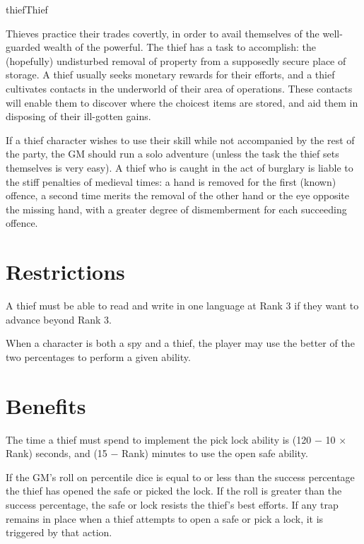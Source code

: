 \begin{Skill}[1.2]{thief}{Thief}

Thieves practice their trades covertly, in order to avail themselves
of the well-guarded wealth of the powerful.  The thief has a task to
accomplish: the (hopefully) undisturbed removal of property from a
supposedly secure place of storage.  A thief usually seeks monetary
rewards for their efforts, and a thief cultivates contacts in the
underworld of their area of operations. These contacts will enable
them to discover where the choicest items are stored, and aid them in
disposing of their ill-gotten gains.

If a thief character wishes to use their skill while not accompanied
by the rest of the party, the GM should run a solo adventure (unless
the task the thief sets themselves is very easy).  A thief who is
caught in the act of burglary is liable to the stiff penalties of
medieval times: a hand is removed for the first (known) offence, a
second time merits the removal of the other hand or the eye opposite
the missing hand, with a greater degree of dismemberment for each
succeeding offence.

\section{Restrictions}

A thief must be able to read and write in one language at Rank 3 if
they want to advance beyond Rank 3.

When a character is both a spy and a thief, the player may use the
better of the two percentages to perform a given ability.

\section{Benefits}
\label{thief:benefits}

The time a thief must spend to implement the pick lock ability is (120
− 10 × Rank) seconds, and (15 − Rank) minutes to use the open safe
ability.

If the GM’s roll on percentile dice is equal to or less than the
success percentage the thief has opened the safe or picked the lock.
If the roll is greater than the success percentage, the safe or lock
resists the thief’s best efforts.  If any trap remains in place when a
thief attempts to open a safe or pick a lock, it is triggered by that
action.


\end{Skill}
